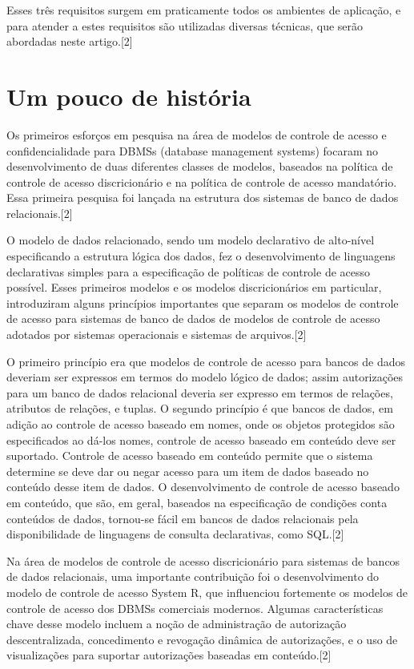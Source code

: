 \documentclass{article}
\begin{document}
Esses três requisitos surgem em praticamente todos os ambientes de aplicação, e para atender a estes requisitos são utilizadas diversas técnicas, que serão abordadas neste artigo.[2]

\section{Um pouco de história}

Os primeiros esforços em pesquisa na área de modelos de controle de acesso e confidencialidade para DBMSs (database management systems) focaram no desenvolvimento de duas diferentes classes de modelos, baseados na política de controle de acesso discricionário e na política de controle de acesso mandatório. Essa primeira pesquisa foi lançada na estrutura dos sistemas de banco de dados relacionais.[2]

O modelo de dados relacionado, sendo um modelo declarativo de alto-nível especificando a estrutura lógica dos dados, fez o desenvolvimento de linguagens declarativas simples para a especificação de políticas de controle de acesso possível. Esses primeiros modelos e os modelos discricionários em particular, introduziram alguns princípios importantes que separam os modelos de controle de acesso para sistemas de banco de dados de modelos de controle de acesso adotados por sistemas operacionais e sistemas de arquivos.[2]

O primeiro princípio era que modelos de controle de acesso para bancos de dados deveriam ser expressos em termos do modelo lógico de dados; assim autorizações para um banco de dados relacional deveria ser expresso em termos de relações, atributos de relações, e tuplas. O segundo princípio é que bancos de dados, em adição ao controle de acesso baseado em nomes, onde os objetos protegidos são especificados ao dá-los nomes, controle de acesso baseado em conteúdo deve ser suportado. Controle de acesso baseado em conteúdo permite que o sistema determine se deve dar ou negar acesso para um item de dados baseado no conteúdo desse item de dados. O desenvolvimento de controle de acesso baseado em conteúdo, que são, em geral, baseados na especificação de condições conta conteúdos de dados, tornou-se fácil em bancos de dados relacionais pela disponibilidade de linguagens de consulta declarativas, como SQL.[2]

Na área de modelos de controle de acesso discricionário para sistemas de bancos de dados relacionais, uma importante contribuição foi o desenvolvimento do modelo de controle de acesso System R, que influenciou fortemente os modelos de controle de acesso dos DBMSs comerciais modernos. Algumas características chave desse modelo incluem a noção de administração de autorização descentralizada, concedimento e revogação dinâmica de autorizações, e o uso de visualizações para suportar autorizações baseadas em conteúdo.[2]
\end{document}
